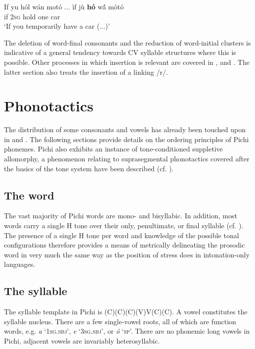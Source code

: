 \ea%
    \label{ex:key:40}
    \gll   If  yu  hól    wán    motó  \op...\cp{}      \ob{}ìf  jù  \textbf{hó}  w\'{ã}   mòtó\cb\\
if  \textsc{2sg}  hold    one    car\\

\glt ‘If you temporarily have a car (...)’
\z

The deletion of word-final consonants and the reduction of word-initial clusters is indicative of a general tendency towards CV syllable structures where this is possible. Other processes in which insertion is relevant are covered in ,  and . The latter section also treats the insertion of a linking /r/.

\section{Phonotactics}\label{sec:2.6}

The distribution of some consonants and vowels has already been touched upon in  and . The following sections provide details on the ordering principles of Pichi phonemes. Pichi also exhibits an instance of tone-conditioned suppletive allomorphy, a phenomenon relating to suprasegmental phonotactics covered after the basics of the tone system have been described (cf. ).

\subsection{The word}\label{sec:2.6.1}

The vast majority of Pichi words are mono- and bisyllabic. In addition, most words carry a single H tone over their only, penultimate, or final syllable (cf. ). The presence of a single H tone per word and knowledge of the possible tonal configurations therefore provides a means of metrically delineating the prosodic word in very much the same way as the position of stress does in intonation-only languages.

\subsection{The syllable}\label{sec:2.6.2}

The syllable template in Pichi is (C)(C)(C)(V)V(C)(C). A vowel constitutes the syllable nucleus. There are a few single-vowel roots, all of which are function words, e.g. \textit{a} ‘\textsc{1sg.sbj}’, \textit{e} ‘\textsc{3sg.sbj}’, or \textit{ó} ‘\textsc{sp}’. There are no phonemic long vowels in Pichi, adjacent vowels are invariably heterosyllabic. 


